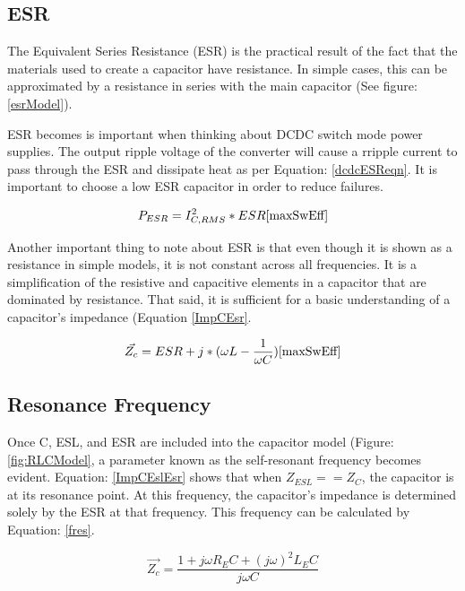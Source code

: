 \subsection{ESR}
\label{sec:ESR}

The Equivalent Series Resistance (ESR) is the practical result of the fact that the materials used to create a capacitor have resistance. In simple cases, this can be approximated by a resistance in series with the main capacitor (See figure: \ref{esrModel}).

ESR becomes is important when thinking about DCDC switch mode power supplies. The output ripple voltage of the converter will cause a rripple current to pass through the ESR and dissipate heat as per Equation: \eqref{dcdcESReqn}. It is important to choose a low ESR capacitor in order to reduce failures.

\begin{equation}
\label{dcdcESReqn}
P_{ESR} = I_{C,RMS}^2 * ESR
\cite{maxSwEff}
\end{equation}

Another important thing to note about ESR is that even though it is shown as a resistance in simple models, it is not constant across all frequencies. It is a simplification of the resistive and capacitive elements in a capacitor that are dominated by resistance. That said, it is sufficient for a basic understanding of a capacitor's impedance (Equation \eqref{ImpCEsr}.

\begin{equation}
\label{ImpCEsr}
\vec{Z_c} = ESR + j * (\omega L - \frac{1}{\omega C})
\cite{maxSwEff}
\end{equation}

\subsection{Resonance Frequency}


Once C, ESL, and ESR are included into the capacitor model (Figure: \ref{fig:RLCModel}, a parameter known as the self-resonant frequency becomes evident. Equation: \eqref{ImpCEslEsr} shows that when $Z_{ESL} == Z_C$, the capacitor is at its resonance point. At this frequency, the capacitor's impedance is determined solely by the ESR at that frequency. This frequency can be calculated by Equation: \eqref{fres}.

\begin{equation}
\label{ImpCEslEsr}
\vec{Z_c} = \frac{1 + j\omega R_EC + (j\omega)^2L_EC}{j\omega C}
\end{equation}

